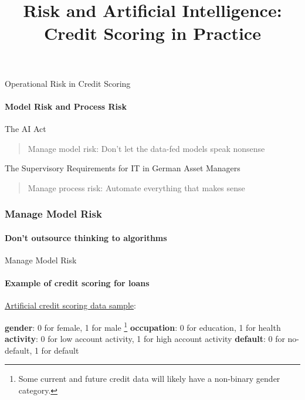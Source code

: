 

\title{Risk and Artificial Intelligence: Credit Scoring in Practice}

\maketitle

\begin{frame}{Operational Risk in Credit Scoring}
    \framesubtitle{Model Risk and Process Risk}
    \begin{block}{The AI Act}
        \begin{quote}
            Manage model risk: Don't let the data-fed models speak nonsense
        \end{quote}
    \end{block}
    \begin{block}{The Supervisory Requirements for IT in German Asset Managers}
        \begin{quote}
            Manage process risk: Automate everything that makes sense
        \end{quote}
    \end{block}
\end{frame}

\begin{frame}
\frametitle{Manage Model Risk}
\framesubtitle{Don't outsource thinking to algorithms}
    \begin{center}
    \end{center}
\end{frame}

\begin{frame}{Manage Model Risk}
    \framesubtitle{Example of credit scoring for loans}

    \href{https://github.com/munichpavel/risk-ai-workshop/blob/main/notebooks/data/default.csv}{Artificial credit scoring data sample}:
    \newline\newline
    
    \newline
    \newline
    \textbf{gender}: 0 for female, 1 for male \footnote{
        Some current and future credit data will likely have a non-binary gender category.
    } \newline
    \textbf{occupation}: 0 for education, 1 for health \newline
    \textbf{activity}: 0 for low account activity, 1 for high account activity \newline
    \textbf{default}: 0 for no-default, 1 for default \newline
\end{frame}

